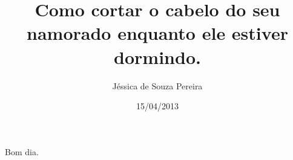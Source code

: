 \documentclass{article}
\author{Jéssica de Souza Pereira}
\date{15/04/2013}
\title{Como cortar o cabelo do seu namorado enquanto ele estiver dormindo.}
\begin{document}
\maketitle
\newpage
Bom dia.
\end{document}
